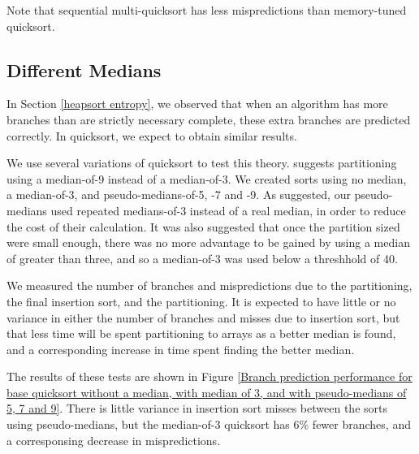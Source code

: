 Note that sequential multi-quicksort has less mispredictions than memory-tuned quicksort.


\subsection{Different Medians}

\label{quick-predictors2}

\label{quicksort entropy}

In Section \ref{heapsort entropy}, we observed that when an algorithm has more
branches than are strictly necessary complete, these extra branches are
predicted correctly. In quicksort, we expect to obtain similar results.


We use several variations of quicksort to test this theory.
\cite{BentleyMcIlroy93} suggests partitioning using a median-of-9 instead of a
median-of-3. We created sorts using no median, a median-of-3, and
pseudo-medians-of-5, -7 and -9. As suggested, our pseudo-medians used repeated
medians-of-3 instead of a real median, in order to reduce the cost of their
calculation. It was also suggested that once the partition sized were small
enough, there was no more advantage to be gained by using a median of greater
than three, and so a median-of-3 was used below a threshhold of 40.

We measured the number of branches and mispredictions due to the partitioning,
the final insertion sort, and the partitioning. It is expected to have little or
no variance in either the number of branches and misses due to insertion sort,
but that less time will be spent partitioning to arrays as a better median is
found, and a corresponding increase in time spent finding the better median.

The results of these tests are shown in Figure \ref{Branch prediction
performance for base quicksort without a median, with median of 3, and with
pseudo-medians of 5, 7 and 9}. There is little variance in insertion sort misses
between the sorts using pseudo-medians, but the median-of-3 quicksort has
6\% fewer branches, and a corresponsing decrease in mispredictions.

